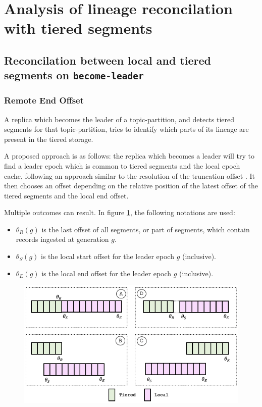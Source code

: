 \documentclass{article}
\begin{document}
\section{Analysis of lineage reconcilation with tiered segments}

\subsection{Reconcilation between local and tiered segments on \texttt{become-leader}}

\subsubsection{Remote End Offset}

A replica which becomes the leader of a topic-partition, and detects tiered segments for that topic-partition, tries to identify which parts of its lineage are present in the tiered storage. 

A proposed approach is as follows: the replica which becomes a leader will try to find a leader epoch which is common to tiered segments and the local epoch cache, following an approach similar to the resolution of the truncation offset \cite{KIP279}. It then chooses an offset depending on the relative position of the latest offset of the tiered segments and the local end offset.

Multiple outcomes can result. In figure \ref{fig:become-leader}, the following notations are used:

\begin{itemize}
	\item $\theta_R(g)$ is the last offset of all segments, or part of segments, which contain records ingested at generation $g$.
	\item $\theta_S(g)$ is the local start offset for the leader epoch $g$ (inclusive).
	\item $\theta_E(g)$ is the local end offset for the leader epoch $g$ (inclusive).
\end{itemize} 

\begin{figure}[h!]
	\centering
	\includegraphics[scale=0.65]{become-leader.png}
	\label{fig:become-leader}
\end{figure}
\end{document}
